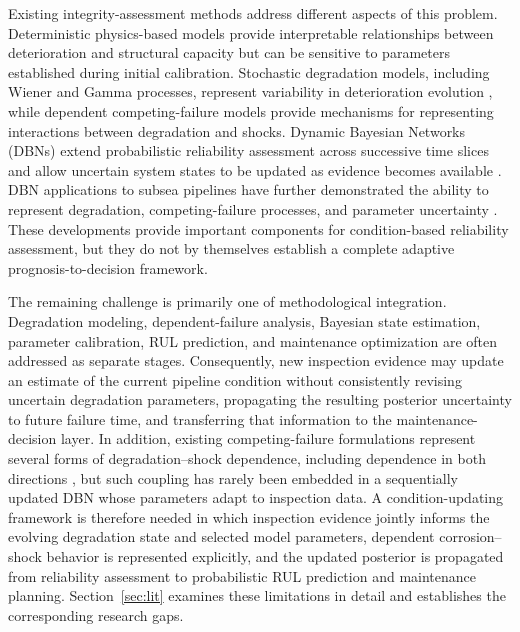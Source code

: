 \documentclass[journal]{IEEEtran}
\begin{document}
Existing integrity-assessment methods address different aspects of
this problem. Deterministic physics-based models provide interpretable
relationships between deterioration and structural capacity but can be
sensitive to parameters established during initial calibration.
Stochastic degradation models, including Wiener and Gamma processes,
represent variability in deterioration evolution
\cite{zhang2018,ling2015}, while dependent competing-failure models
provide mechanisms for representing interactions between degradation
and shocks. Dynamic Bayesian Networks (DBNs) extend probabilistic
reliability assessment across successive time slices and allow uncertain
system states to be updated as evidence becomes available
\cite{straub2009}. DBN applications to subsea pipelines have further
demonstrated the ability to represent degradation, competing-failure
processes, and parameter uncertainty \cite{liu2023,cai2020rul}.
These developments provide important components for condition-based
reliability assessment, but they do not by themselves establish a
complete adaptive prognosis-to-decision framework.

The remaining challenge is primarily one of methodological
integration. Degradation modeling, dependent-failure analysis,
Bayesian state estimation, parameter calibration, RUL prediction, and
maintenance optimization are often addressed as separate stages.
Consequently, new inspection evidence may update an estimate of the
current pipeline condition without consistently revising uncertain
degradation parameters, propagating the resulting posterior uncertainty
to future failure time, and transferring that information to the
maintenance-decision layer. In addition, existing competing-failure
formulations represent several forms of degradation--shock dependence,
including dependence in both directions \cite{sun2021}, but such
coupling has rarely been embedded in a sequentially updated DBN whose
parameters adapt to inspection data. A condition-updating framework is therefore
needed in which inspection evidence jointly informs the evolving
degradation state and selected model parameters, dependent
corrosion--shock behavior is represented explicitly, and the updated
posterior is propagated from reliability assessment to probabilistic
RUL prediction and maintenance planning. Section~\ref{sec:lit}
examines these limitations in detail and establishes the corresponding
research gaps.
\end{document}
